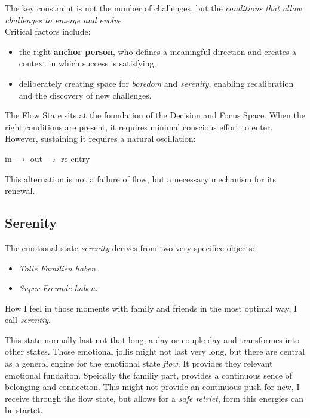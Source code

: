 The key constraint is not the number of challenges, but the \textit{conditions that allow challenges to emerge and evolve}.\\

Critical factors include:

\begin{itemize}
	\item the right \textbf{anchor person}, who defines a meaningful direction and creates a context in which success is satisfying,
	\item deliberately creating space for \textit{boredom} and \textit{serenity}, enabling recalibration and the discovery of new challenges.
\end{itemize}

The Flow State sits at the foundation of the Decision and Focus Space. When the right conditions are present, it requires minimal conscious effort to enter. However, sustaining it requires a natural oscillation:

\begin{center}
	in $\rightarrow$ out $\rightarrow$ re-entry
\end{center}

This alternation is not a failure of flow, but a necessary mechanism for its renewal.

\subsection{Serenity}

The emotional state \textit{serenity} derives from two very specifice objects:
\begin{itemize}
	\item \textit{Tolle Familien haben.}
	\item \textit{Super Freunde haben.}
\end{itemize}

How I feel in those moments with family and friends in the most optimal way, I call \textit{serentiy}.

This state normally last not that long, a day or couple day and transformes into other states. Those emotional jollis might not last very long, but there are central as a general engine for the emotional state \textit{flow}. It provides they relevant emotional fundaiton. Speically the familiy part, provides a continuous sence of belonging and connection. This might not provide an continuous push for new, I receive through the flow state, but allows for a \textit{safe retriet}, form this energies can be startet.

